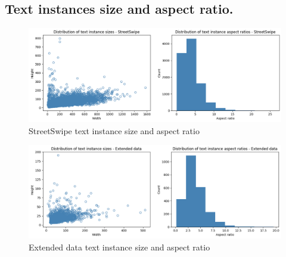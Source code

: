 \begin{appendices}
\section{Text instances size and aspect ratio.}
\label{sec:apx:instances}

    \begin{figure}[H]
        \centering
        \includegraphics[width=\textwidth]{media/methodology/SS_ins_sz.png}
        \caption{StreetSwipe text instance size and aspect ratio}
        \label{fig:SS_ins_sz}
    \end{figure}
    
    \begin{figure}[H]
        \centering
        \includegraphics[width=\textwidth]{media/methodology/pano_ins_sz.png}
        \caption{Extended data text instance size and aspect ratio}
        \label{fig:pano_ins_sz}
    \end{figure}


\end{appendices}



